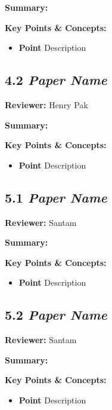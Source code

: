 \documentclass{article}
\begin{document}
\vspace{0.3cm}

\textbf{Summary:}

\vspace{0.3cm}

\textbf{Key Points \& Concepts:}
\begin{itemize}
  \item \textbf{Point} Description
\end{itemize}

\subsection*{4.2 \textit{Paper Name}}

\hspace*{\parindent}\textbf{Reviewer:} Henry Pak

\vspace{0.3cm}

\textbf{Summary:}

\vspace{0.3cm}

\textbf{Key Points \& Concepts:}
\begin{itemize}
  \item \textbf{Point} Description
\end{itemize}

\subsection*{5.1 \textit{Paper Name}}

\hspace*{\parindent}\textbf{Reviewer:} Santam

\vspace{0.3cm}

\textbf{Summary:}

\vspace{0.3cm}

\textbf{Key Points \& Concepts:}
\begin{itemize}
  \item \textbf{Point} Description
\end{itemize}

\subsection*{5.2 \textit{Paper Name}}

\hspace*{\parindent}\textbf{Reviewer:} Santam

\vspace{0.3cm}

\textbf{Summary:}

\vspace{0.3cm}

\textbf{Key Points \& Concepts:}
\begin{itemize}
  \item \textbf{Point} Description
\end{itemize}
\end{document}
